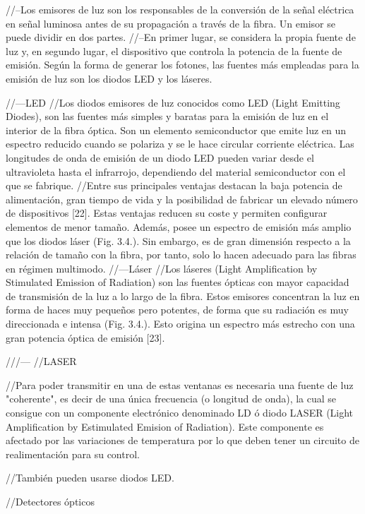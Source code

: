 \begin{itemize}
\begin{itemize}
 		//--Los emisores de luz son los responsables de la conversión de la señal eléctrica en señal luminosa antes de su propagación a través de la fibra. Un emisor se puede dividir en dos partes.
 		//--En primer lugar, se considera la propia fuente de luz y, en segundo lugar, el dispositivo que controla la potencia de la fuente de emisión. Según la forma de generar los fotones, las fuentes más empleadas para la emisión de luz son los diodos LED y los láseres.
 		
 		//---LED
 		//Los diodos emisores de luz conocidos como LED (Light Emitting Diodes), son las fuentes más simples y baratas para la emisión de luz en el interior de la fibra óptica. Son un elemento semiconductor que emite luz en un espectro reducido cuando se polariza y se le hace circular corriente eléctrica. Las longitudes de onda de emisión de un diodo LED pueden variar desde el ultravioleta hasta el infrarrojo, dependiendo del material semiconductor con el que se fabrique.
 		//Entre sus principales ventajas destacan la baja potencia de alimentación, gran tiempo de vida y la posibilidad de fabricar un elevado número de dispositivos [22]. Estas ventajas reducen su coste y permiten configurar elementos de menor tamaño. Además, posee un espectro de emisión más amplio que los diodos láser (Fig. 3.4.). Sin embargo, es de gran dimensión	respecto a la relación de tamaño con la fibra, por tanto, solo lo hacen adecuado para las fibras en régimen multimodo.
 		//---Láser
 		//Los láseres (Light Amplification by Stimulated Emission of Radiation) son las fuentes ópticas con mayor capacidad de transmisión de la luz a lo largo de la fibra. Estos emisores concentran la luz en forma de haces muy pequeños pero potentes, de forma que su radiación es muy direccionada e intensa (Fig. 3.4.). Esto origina un espectro más estrecho con una gran potencia óptica de emisión [23].
 		
 		///---
 		//LASER
 		
 		//Para poder transmitir en una de estas ventanas es necesaria una fuente de luz "coherente", es decir de una única frecuencia (o longitud de onda), la cual se consigue con un componente electrónico denominado LD ó diodo LASER (Light Amplification by Estimulated Emision of Radiation). Este componente es afectado por las variaciones de temperatura por lo que deben tener un circuito de realimentación para su control.
 		
 		//También pueden usarse diodos LED.
 		
 		//Detectores ópticos
 		

\end{itemize}
\end{itemize}
